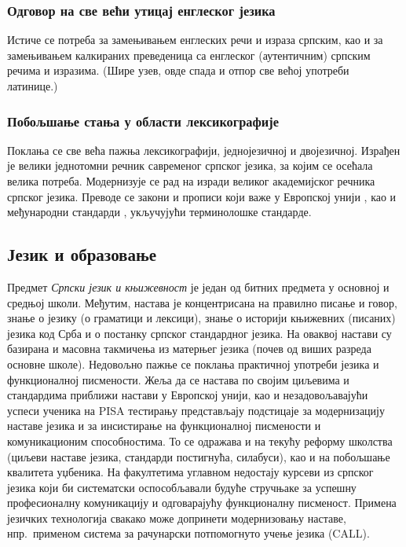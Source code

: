 \begin{multicols}{2}
\subsubsection {Одговор на све већи утицај енглеског језика}
   
 Истиче се потреба за замењивањем енглеских речи и израза српским, као и за замењивањем калкираних преведеница са енглеског (аутентичним) српским речима и изразима. (Шире узев, овде спада и отпор све већој употреби латинице.)
 
 \subsubsection {Побољшање стања у области лексикографије}
   
 Поклања се све већа пажња лексикографији, једнојезичној и двојезичној. Израђен је велики једнотомни речник савременог српског језика, за којим се осећала велика потреба. Модернизује се рад на изради великог академијског речника српског језика.
Преводе се закони и прописи који важе у Европској унији \cite{SEIO}, као и међународни стандарди \cite{ISS}, укључујући терминолошке стандарде.
 
 \subsection {Језик и образовање}
   
 
Предмет \textit{Српски језик и књижевност} је један од битних предмета у основној и средњој  школи. Међутим, настава је концентрисана на правилно писање и говор, знање о језику (о граматици и лексици), знање о историји књижевних (писаних) језика код Срба и о постанку српског стандардног језика. На оваквој настави су базирана и масовна такмичења из матерњег језика (почев од виших разреда основне школе). Недовољно пажње се поклања практичној употреби језика и функционалној писмености. 
Жеља да се настава по својим циљевима и стандардима приближи настави у Европској 
унији, као и   незадовољавајући успеси ученика на PISA тестирању представљају подстицаје за модернизацију наставе језика и за инсистирање на функционалној писмености и комуникационим способностима. То се одражава и на текућу реформу  школства (циљеви наставе језика, стандарди постигнућа, силабуси), као и на побољшање квалитета уџбеника. На факултетима углавном недостају курсеви из српског језика који би систематски оспособљавали будуће стручњаке за успешну професионалну комуникацију и одговарајућу функционалну писменост. 
Примена језичких технологија свакако може допринети  модернизовању наставе, нпр.~применом система за рачунарски потпомогнуто учење језика (CALL). 
 

\end{multicols}
